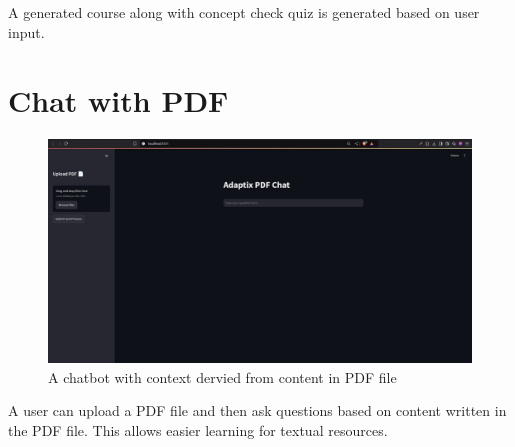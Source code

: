 A generated course along with concept check quiz is generated based on user input.
\newpage

\section{Chat with PDF}
\begin{figure}[h!]
    \centering
    \includegraphics[scale=0.28]{Images/chat-with-pdf.jpeg}
    \caption{A chatbot with context dervied from content in PDF file}
    \label{fig:chat-with-pdf}
\end{figure}

A user can upload a PDF file and then ask questions based on content written in the PDF file.  
This allows easier learning for textual resources.

